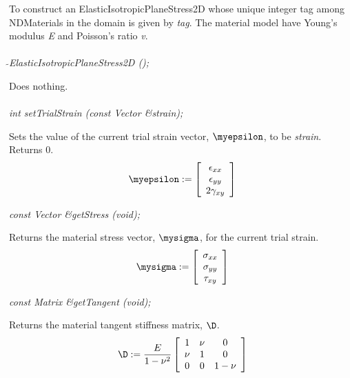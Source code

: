 To construct an ElasticIsotropicPlaneStress2D whose unique integer tag
among NDMaterials in the domain is given by {\em tag}.  The material
model have Young's modulus {\em E} and Poisson's ratio {\em v}. \\

 \\
{\em $\tilde{ }$ElasticIsotropicPlaneStress2D ();} 

Does nothing. \\ 

 \\
{\em int setTrialStrain (const Vector \&strain); }  

Sets the value of the current trial strain vector, $\myepsilon$,
to be {\em strain}. Returns $0$. \\

\begin{displaymath}
\myepsilon := \left[
   \begin{array}{c}
       \epsilon_{xx} \\
       \epsilon_{yy}   \\
       2 \gamma_{xy}   
   \end{array} 
 \right]
\end{displaymath}

{\em const Vector \&getStress (void); } 

Returns the material stress vector, $\mysigma$, for the current
trial strain. \\

\begin{displaymath}
\mysigma := \left[
   \begin{array}{c}
       \sigma_{xx} \\
       \sigma_{yy}   \\
       \tau_{xy}   
   \end{array} 
 \right]
\end{displaymath}

{\em const Matrix \&getTangent (void); } 

Returns the material tangent stiffness matrix, $\D$. \\

\begin{displaymath}
\D := \frac{E}{1-\nu^2} \left[
   \begin{array}{ccc}
         1 & \nu &     0 \\
       \nu &   1 &     0 \\
         0 &   0 & 1-\nu
   \end{array} 
 \right]
\end{displaymath}


